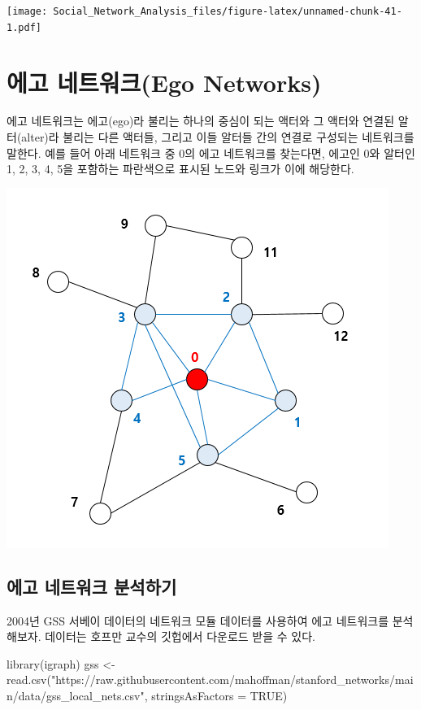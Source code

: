 \documentclass[
]{book}
\newenvironment{Shaded}{\begin{snugshade}}{\end{snugshade}}
\newcommand{\AttributeTok}[1]{\textcolor[rgb]{0.77,0.63,0.00}{#1}}
\newcommand{\ConstantTok}[1]{\textcolor[rgb]{0.00,0.00,0.00}{#1}}
\newcommand{\FunctionTok}[1]{\textcolor[rgb]{0.00,0.00,0.00}{#1}}
\newcommand{\NormalTok}[1]{#1}
\newcommand{\OtherTok}[1]{\textcolor[rgb]{0.56,0.35,0.01}{#1}}
\newcommand{\StringTok}[1]{\textcolor[rgb]{0.31,0.60,0.02}{#1}}
\begin{document}
\texttt{[image: Social\_Network\_Analysis\_files/figure-latex/unnamed-chunk-41-1.pdf]}

\hypertarget{uxc5d0uxace0-uxb124uxd2b8uxc6ccuxd06cego-networks}{%
\chapter{에고 네트워크(Ego Networks)}\label{uxc5d0uxace0-uxb124uxd2b8uxc6ccuxd06cego-networks}}

에고 네트워크는 에고(ego)라 불리는 하나의 중심이 되는 액터와 그 액터와 연결된 알터(alter)라 불리는 다른 액터들, 그리고 이들 알터들 간의 연결로 구성되는 네트워크를 말한다.
예를 들어 아래 네트워크 중 0의 에고 네트워크를 찾는다면, 에고인 0와 알터인 1, 2, 3, 4, 5을 포함하는 파란색으로 표시된 노드와 링크가 이에 해당한다.

\begin{center}\includegraphics[width=0.45\linewidth]{images/ego} \end{center}

\hypertarget{uxc5d0uxace0-uxb124uxd2b8uxc6ccuxd06c-uxbd84uxc11duxd558uxae30}{%
\section{에고 네트워크 분석하기}\label{uxc5d0uxace0-uxb124uxd2b8uxc6ccuxd06c-uxbd84uxc11duxd558uxae30}}

2004년 GSS 서베이 데이터의 네트워크 모듈 데이터를 사용하여 에고 네트워크를 분석해보자.
데이터는 호프만 교수의 깃헙에서 다운로드 받을 수 있다.

\begin{Shaded}
\begin{Highlighting}[]
\FunctionTok{library}\NormalTok{(igraph)}
\NormalTok{gss }\OtherTok{\textless{}{-}} \FunctionTok{read.csv}\NormalTok{(}\StringTok{"https://raw.githubusercontent.com/mahoffman/stanford\_networks/main/data/gss\_local\_nets.csv"}\NormalTok{, }\AttributeTok{stringsAsFactors =} \ConstantTok{TRUE}\NormalTok{) }
\end{Highlighting}
\end{Shaded}
\end{document}
